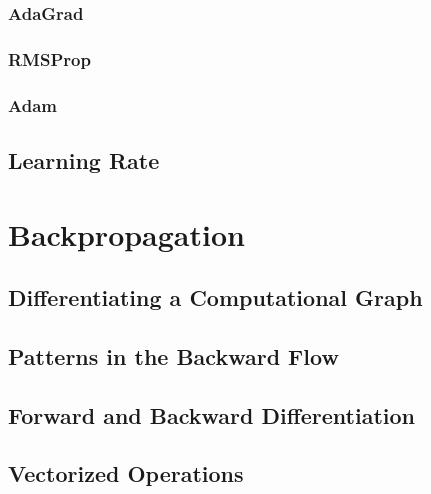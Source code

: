 		\subsection{AdaGrad} %

		\subsection{RMSProp} %

		\subsection{Adam} %

	\section{Learning Rate} %

\chapter{Backpropagation} %

	\section{Differentiating a Computational Graph} %

	\section{Patterns in the Backward Flow} %

	\section{Forward and Backward Differentiation} %

	\section{Vectorized Operations} %

